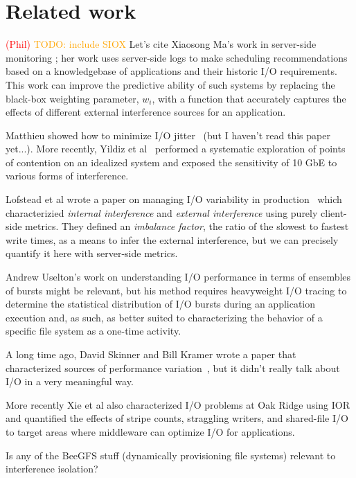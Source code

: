 \documentclass[conference,10pt,compsocconf]{IEEEtran}
\newcommand{\assign}[1]{\textcolor{red}{(#1)}}
\newcommand{\todo}[1]{\textcolor{Orange}{TODO: #1}}
\begin{document}
\section{Related work} \label{related}

\assign{Phil} \todo{include SIOX} Let's cite Xiaosong Ma's work in server-side
monitoring \cite{Liu2016}; her work uses server-side logs to make scheduling
recommendations based on a knowledgebase of applications and their historic
I/O requirements.  This work can improve the predictive ability of such systems
by replacing the black-box weighting parameter, $w_{i}$, with a function that
accurately captures the effects of different external interference sources for
an application.

Matthieu showed how to minimize I/O jitter~\cite{Dorier2012} (but I haven't read
this paper yet...).  More recently, Yildiz et al~\cite{Yildiz2016} performed
a systematic exploration of points of contention on an idealized system and
exposed the sensitivity of 10 GbE to various forms of interference.

Lofstead et al wrote a paper on managing I/O variability in production~
\cite{Lofstead2010} which characterizied \emph{internal interference} and
\emph{external interference} using purely client-side metrics.  They defined an
\emph{imbalance factor}, the ratio of the slowest to fastest write times, as a
means to infer the external interference, but we can precisely quantify it here
with server-side metrics.

Andrew Uselton's work on understanding I/O performance in terms of ensembles of
bursts might be relevant\cite{Uselton2010}, but his method requires heavyweight
I/O tracing to determine the statistical distribution of I/O bursts during an
application execution and, as such, as better suited to characterizing the
behavior of a specific file system as a one-time activity.

A long time ago, David Skinner and Bill Kramer wrote a paper that characterized
sources of performance variation~\cite{Skinner2005}, but it didn't really talk
about I/O in a very meaningful way.

More recently Xie et al also characterized I/O problems at Oak
Ridge\cite{Xie2012} using IOR and quantified the effects of stripe counts,
straggling writers, and shared-file I/O to target areas where middleware can
optimize I/O for applications.

Is any of the BeeGFS stuff (dynamically provisioning file systems) relevant to
interference isolation?
\end{document}

